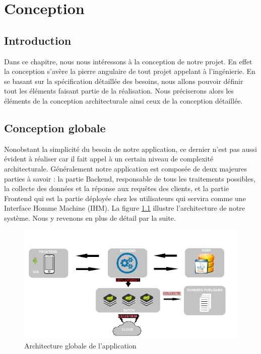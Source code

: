 \chapter{Conception}

\section*{Introduction}
\qquad Dans ce chapitre, nous nous intéressons à la conception de notre projet. En effet la conception s'avère la pierre angulaire de tout projet appelant à l'ingénierie. En se basant sur la spécification détaillée des besoins, nous allons pouvoir définir tout les éléments faisant partie de la réalisation. Nous préciserons alors les éléments de la conception architecturale ainsi ceux de la conception détaillée.\\

\section{Conception globale}

\qquad Nonobstant la simplicité du besoin de notre application, ce dernier n'est pas aussi évident à réaliser car il fait appel à un certain niveau de complexité architecturale. Généralement notre application est composée de deux majeures parties à savoir : la partie Backend, responsable de tous les traitements possibles, la collecte des données et la réponse aux requêtes des clients, et la partie Frontend qui est la partie déployée chez les utilisateurs qui servira comme une Interface Homme Machine (IHM). La figure \ref{fig3.1} illustre l'architecture de notre système. Nous y revenons en plus de détail par la suite.

\begin{figure}[!h]
	\begin{center}
		\includegraphics[width=0.914\linewidth]{figures/arch}
	\end{center}
	\caption{Architecture globale de l'application}
	\label{fig3.1}
\end{figure} 

